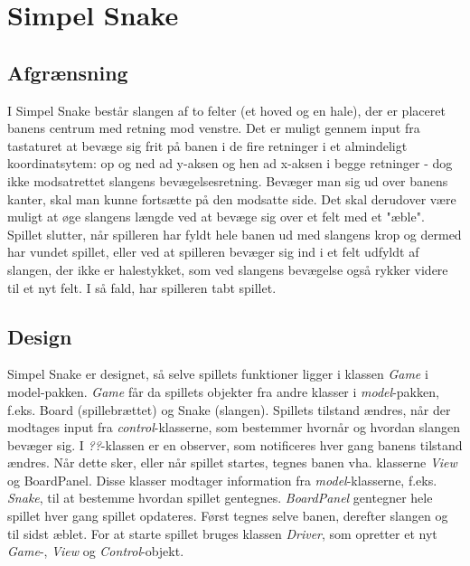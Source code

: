 \documentclass{report}
\begin{document}
\chapter{Simpel Snake}
\section{Afgrænsning}
I Simpel Snake består slangen af to felter (et hoved og en hale), der er placeret banens centrum med retning mod venstre. Det er muligt gennem input fra tastaturet at bevæge sig frit på banen i de fire retninger i et almindeligt koordinatsytem: op og ned ad y-aksen og hen ad x-aksen i begge retninger - dog ikke modsatrettet slangens bevægelsesretning. Bevæger man sig ud over banens kanter, skal man kunne fortsætte på den modsatte side. Det skal derudover være muligt at øge slangens længde ved at bevæge sig over et felt med et "æble". Spillet slutter, når spilleren har fyldt hele banen ud med slangens krop og dermed har vundet spillet, eller ved at spilleren bevæger sig ind i et felt udfyldt af slangen, der ikke er halestykket, som ved slangens bevægelse også rykker videre til et nyt felt. I så fald, har spilleren tabt spillet.
\linebreak

\section{Design}
Simpel Snake er designet, så selve spillets funktioner ligger i klassen \textit{Game} i model-pakken. \textit{Game} får da spillets objekter fra andre klasser i \textit{model}-pakken, f.eks. Board (spillebrættet) og Snake (slangen). Spillets tilstand ændres, når der modtages input fra \textit{control}-klasserne, som bestemmer hvornår og hvordan slangen bevæger sig. I \textit{??}-klassen er en observer, som notificeres hver gang banens tilstand ændres. Når dette sker, eller når spillet startes, tegnes banen vha. klasserne \textit{View} og {BoardPanel}. Disse klasser modtager information fra \textit{model}-klasserne, f.eks. \textit{Snake}, til at bestemme hvordan spillet gentegnes. \textit{BoardPanel} gentegner hele spillet hver gang spillet opdateres. Først tegnes selve banen, derefter slangen og til sidst æblet. 
For at starte spillet bruges klassen \textit{Driver}, som opretter et nyt \textit{Game}-, \textit{View} og \textit{Control}-objekt.
\linebreak
\end{document}
